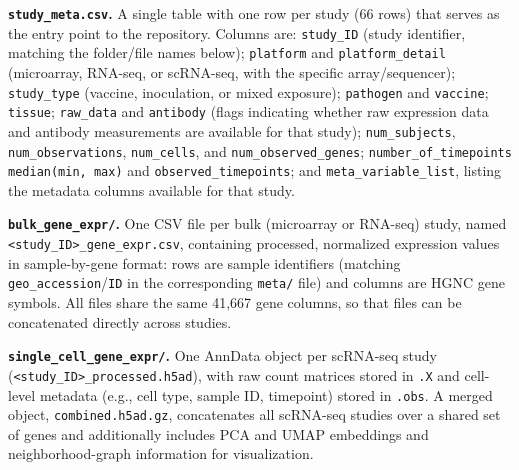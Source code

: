 \documentclass[
  12pt]{article}
\begin{document}
\noindent\textbf{\texttt{study\_meta.csv}.} A single table with one row per study (66 rows) that serves as the entry point to the repository. Columns are: \texttt{study\_ID} (study identifier, matching the folder/file names below); \texttt{platform} and \texttt{platform\_detail} (microarray, RNA-seq, or scRNA-seq, with the specific array/sequencer); \texttt{study\_type} (vaccine, inoculation, or mixed exposure); \texttt{pathogen} and \texttt{vaccine}; \texttt{tissue}; \texttt{raw\_data} and \texttt{antibody} (flags indicating whether raw expression data and antibody measurements are available for that study); \texttt{num\_subjects}, \texttt{num\_observations}, \texttt{num\_cells}, and \texttt{num\_observed\_genes}; \texttt{number\_of\_timepoints median(min, max)} and \texttt{observed\_timepoints}; and \texttt{meta\_variable\_list}, listing the metadata columns available for that study.

\noindent\textbf{\texttt{bulk\_gene\_expr/}.} One CSV file per bulk (microarray or RNA-seq) study, named \texttt{<study\_ID>\_gene\_expr.csv}, containing processed, normalized expression values in sample-by-gene format: rows are sample identifiers (matching \texttt{geo\_accession}/\texttt{ID} in the corresponding \texttt{meta/} file) and columns are HGNC gene symbols. All files share the same 41,667 gene columns, so that files can be concatenated directly across studies.

\noindent\textbf{\texttt{single\_cell\_gene\_expr/}.} One AnnData object per scRNA-seq study (\texttt{<study\_ID>\_processed.h5ad}), with raw count matrices stored in \texttt{.X} and cell-level metadata (e.g., cell type, sample ID, timepoint) stored in \texttt{.obs}. A merged object, \texttt{combined.h5ad.gz}, concatenates all scRNA-seq studies over a shared set of genes and additionally includes PCA and UMAP embeddings and neighborhood-graph information for visualization.
\end{document}
